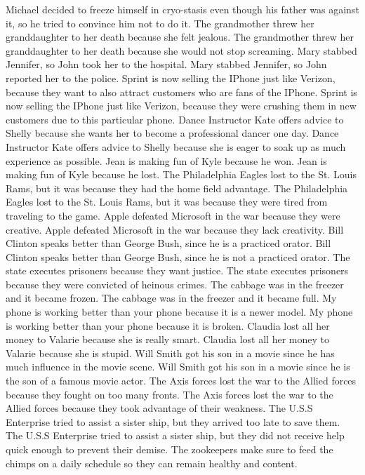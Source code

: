 \documentclass{article}
\begin{document}
\begin{enumerate}
	Michael decided to freeze himself in cryo-stasis even though his father was against it, so he tried to convince him not to do it.
	The grandmother threw her granddaughter to her death because she felt jealous.
	The grandmother threw her granddaughter to her death because she would not stop screaming.
	Mary stabbed Jennifer, so John took her to the hospital.
	Mary stabbed Jennifer, so John reported her to the police.
	Sprint is now selling the IPhone just like Verizon, because they want to also attract customers who are fans of the IPhone.
	Sprint is now selling the IPhone just like Verizon, because they were crushing them in new customers due to this particular phone.
	Dance Instructor Kate offers advice to Shelly because she wants her to become a professional dancer one day.
	Dance Instructor Kate offers advice to Shelly because she is eager to soak up as much experience as possible.
	Jean is making fun of Kyle because he won.
	Jean is making fun of Kyle because he lost.
	The Philadelphia Eagles lost to the St. Louis Rams, but it was because they had the home field advantage.
	The Philadelphia Eagles lost to the St. Louis Rams, but it was because they were tired from traveling to the game.
	Apple defeated Microsoft in the war because they were creative.
	Apple defeated Microsoft in the war because they lack creativity.
	Bill Clinton speaks better than George Bush, since he is a practiced orator.
	Bill Clinton speaks better than George Bush, since he is not a practiced orator.
	The state executes prisoners because they want justice.
	The state executes prisoners because they were convicted of heinous crimes.
	The cabbage was in the freezer and it became frozen.
	The cabbage was in the freezer and it became full.
	My phone is working better than your phone because it is a newer model.
	My phone is working better than your phone because it is broken.
	Claudia lost all her money to Valarie because she is really smart.
	Claudia lost all her money to Valarie because she is stupid.
	Will Smith got his son in a movie since he has much influence in the movie scene.
	Will Smith got his son in a movie since he is the son of a famous movie actor.
	The Axis forces lost the war to the Allied forces because they fought on too many fronts.
	The Axis forces lost the war to the Allied forces because they took advantage of their weakness.
	The U.S.S Enterprise tried to assist a sister ship, but they arrived too late to save them.
	The U.S.S Enterprise tried to assist a sister ship, but they did not receive help quick enough to prevent their demise.
	The zookeepers make sure to feed the chimps on a daily schedule so they can remain healthy and content.

\end{enumerate}
\end{document}
